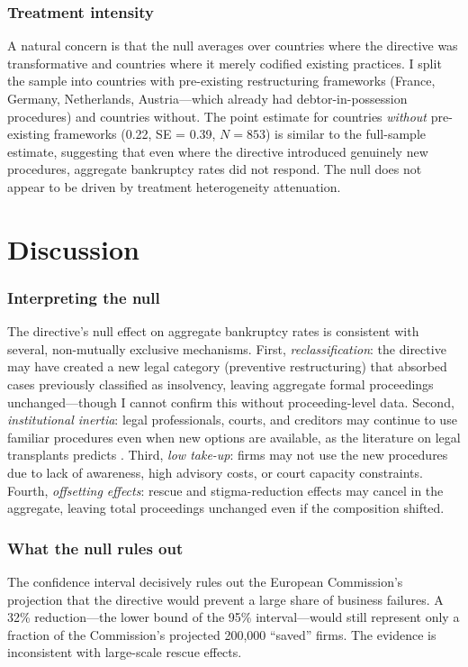 \documentclass[12pt]{article}
\begin{document}
\subsubsection*{Treatment intensity} A natural concern is that the null averages over countries where the directive was transformative and countries where it merely codified existing practices. I split the sample into countries with pre-existing restructuring frameworks (France, Germany, Netherlands, Austria---which already had debtor-in-possession procedures) and countries without. The point estimate for countries \textit{without} pre-existing frameworks (0.22, SE = 0.39, $N = 853$) is similar to the full-sample estimate, suggesting that even where the directive introduced genuinely new procedures, aggregate bankruptcy rates did not respond. The null does not appear to be driven by treatment heterogeneity attenuation.




\section{Discussion}
\label{sec:discussion}

\subsubsection*{Interpreting the null} The directive's null effect on aggregate bankruptcy rates is consistent with several, non-mutually exclusive mechanisms. First, \textit{reclassification}: the directive may have created a new legal category (preventive restructuring) that absorbed cases previously classified as insolvency, leaving aggregate formal proceedings unchanged---though I cannot confirm this without proceeding-level data. Second, \textit{institutional inertia}: legal professionals, courts, and creditors may continue to use familiar procedures even when new options are available, as the literature on legal transplants predicts \citep{BerkowitzEtAl2003}. Third, \textit{low take-up}: firms may not use the new procedures due to lack of awareness, high advisory costs, or court capacity constraints. Fourth, \textit{offsetting effects}: rescue and stigma-reduction effects may cancel in the aggregate, leaving total proceedings unchanged even if the composition shifted.

\subsubsection*{What the null rules out} The confidence interval decisively rules out the European Commission's projection that the directive would prevent a large share of business failures. A 32\% reduction---the lower bound of the 95\% interval---would still represent only a fraction of the Commission's projected 200,000 ``saved'' firms. The evidence is inconsistent with large-scale rescue effects.
\end{document}
